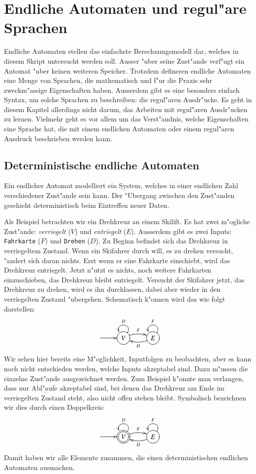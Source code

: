 %
%
\chapter{Endliche Automaten und regul"are Sprachen\label{chapter-regular}}
Endliche Automaten stellen das einfachste Berechnungsmodell
dar, welches in diesem Skript untersucht werden soll. Ausser 
"uber seine Zust"ande verf"ugt ein Automat "uber keinen weiteren
Speicher.
Trotzdem defineren endliche Automaten eine Menge von Sprachen, die 
mathematisch und f"ur die Praxis sehr zweckm"assige Eigenschaften
haben.
Ausserdem gibt es eine besonders einfach Syntax, um
solche Sprachen zu beschreiben: die regul"aren Ausdr"ucke.
Es geht in diesem Kapitel allerdings nicht darum, das Arbeiten
mit regul"aren Ausdr"ucken zu lernen.
Vielmehr geht es vor allem um das Verst"andnis, welche Eigenschaften
eine Sprache hat, die mit einem endlichen Automaten oder einem
regul"aren Ausdruck beschrieben werden kann.

\section{Deterministische endliche Automaten\label{regulaer:dea}}
Ein endlicher Automat modelliert ein System, welches
in einer endlichen Zahl verschiedener Zust"ande sein kann. Der
"Ubergang zwischen den Zust"anden geschieht deterministisch beim
Eintreffen neuer Daten.

Als Beispiel betrachten wir ein Drehkreuz an einem Skilift.
Es hat zwei m"ogliche Zust"ande: {\it  verriegelt} ($V$)
und  {\it entriegelt} ($E$).
Ausserdem gibt es zwei Inputs: {\tt Fahrkarte} ($F$)
und {\tt Drehen} ($D$). Zu Beginn befindet sich das Drehkreuz
in verriegeltem Zustand. Wenn ein Skifahrer durch will, es zu drehen
versucht, "andert sich daran nichts. Erst wenn er eine Fahrkarte einschiebt,
wird das Drehkreuz entriegelt. Jetzt n"utzt es nichts, noch weitere
Fahrkarten einzuschieben, das Drehkreuz bleibt entriegelt.
Versucht der Skifahrer jetzt, das Drehkreuz zu drehen, wird es
ihn durchlassen, dabei aber wieder in den verriegelten Zustand "ubergehen.
Schematisch k"onnen wird das wie folgt darstellen:
\[
\entrymodifiers={++[o][F]}
\xymatrix{
*+\txt{} \ar[r]
	&{V}\ar@/^/[r]^{F} \ar@(ur,ul)_{D}
		&{E}\ar@/^/[l]^{D} \ar@(ur,ul)_{F}
}
\]
Wir sehen hier bereits eine M"oglichkeit, Inputfolgen zu beobachten, 
aber es kann noch nicht entschieden werden, welche Inputs akzeptabel
sind. Dazu m"ussen die einzelne Zust"ande ausgezeichnet werden.
Zum Beispiel k"onnte man verlangen, dass nur Abl"aufe akzeptabel
sind, bei denen das Drehkreuz am Ende im verriegelten Zustand steht,
also nicht offen stehen bleibt. Symbolisch bezeichnen wir dies durch
einen Doppelkreis:
\[
\entrymodifiers={++[o][F]}
\xymatrix{
*+\txt{} \ar[r]
	&*++[o][F=]{V}\ar@/^/[r]^{F} \ar@(ur,ul)_{D}
		&{E}\ar@/^/[l]^{D} \ar@(ur,ul)_{F}
}
\]
Damit haben wir alle Elemente zusammen, die einen deterministischen
endlichen Automaten ausmachen.
